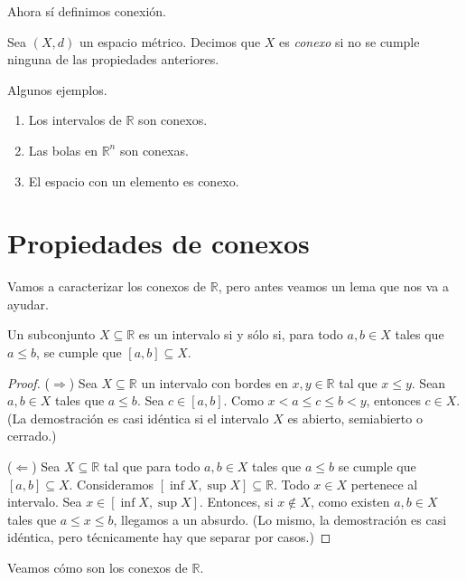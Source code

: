 Ahora sí definimos conexión.

\begin{definition}
	Sea $(X, d)$ un espacio métrico. Decimos que $X$ es \emph{conexo} si no se cumple ninguna de las propiedades anteriores.
\end{definition}

Algunos ejemplos.

\begin{example}
	\begin{enumerate}
		\item Los intervalos de $\mathbb{R}$ son conexos.
		\item Las bolas en $\mathbb{R}^n$ son conexas.
		\item El espacio con un elemento es conexo.
	\end{enumerate}
\end{example}

\section{Propiedades de conexos}

Vamos a caracterizar los conexos de $\mathbb{R}$, pero antes veamos un lema que nos va a ayudar.

\begin{lemma}
	Un subconjunto $X \subseteq \mathbb{R}$ es un intervalo si y sólo si, para todo $a, b \in X$ tales que $a \leq b$, se cumple que $[a, b] \subseteq X$.
\end{lemma}

\begin{proof}
	($\Rightarrow$) Sea $X \subseteq \mathbb{R}$ un intervalo con bordes en $x, y \in \mathbb{R}$ tal que $x \leq y$. Sean $a, b \in X$ tales que $a \leq b$. Sea $c \in [a, b]$. Como $x < a \leq c \leq b < y$, entonces $c \in X$. (La demostración es casi idéntica si el intervalo $X$ es abierto, semiabierto o cerrado.)

	($\Leftarrow$) Sea $X \subseteq \mathbb{R}$ tal que para todo $a, b \in X$ tales que $a \leq b$ se cumple que $[a, b] \subseteq X$. Consideramos $[\inf X, \sup X] \subseteq \mathbb{R}$. Todo $x \in X$ pertenece al intervalo. Sea $x \in [\inf X, \sup X]$. Entonces, si $x \not \in X$, como existen $a, b \in X$ tales que $a \leq x \leq b$, llegamos a un absurdo. (Lo mismo, la demostración es casi idéntica, pero técnicamente hay que separar por casos.)
\end{proof}

Veamos cómo son los conexos de $\mathbb{R}$.

